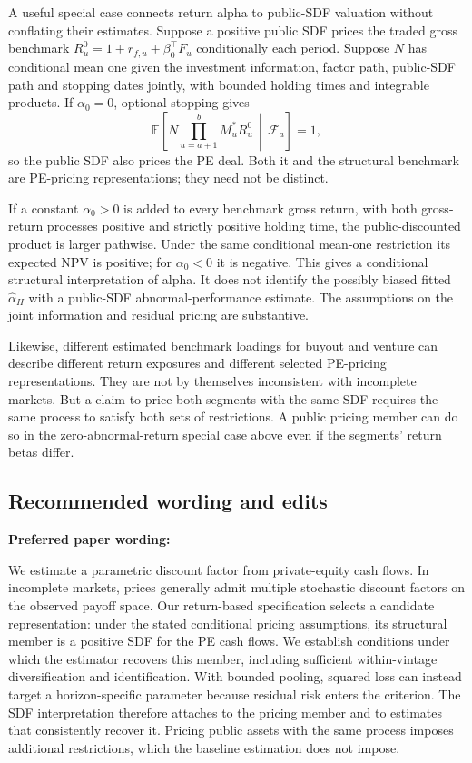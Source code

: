 \documentclass[11pt]{article}
\newcommand{\E}{\mathbb{E}}
\theoremstyle{plain}
\theoremstyle{definition}
\begin{document}
A useful special case connects return alpha to public-SDF valuation without conflating their estimates. Suppose a positive public SDF prices the traded gross benchmark $R^0_u=1+r_{f,u}+\beta_0^\top F_u$ conditionally each period. Suppose $N$ has conditional mean one given the investment information, factor path, public-SDF path and stopping dates jointly, with bounded holding times and integrable products. If $\alpha_0=0$, optional stopping gives
\[
\E\left[N\prod_{u=a+1}^b M_u^\ast R^0_u\,\middle|\,\mathcal F_a\right]=1,
\]
so the public SDF also prices the PE deal. Both it and the structural benchmark are PE-pricing representations; they need not be distinct.

If a constant $\alpha_0>0$ is added to every benchmark gross return, with both gross-return processes positive and strictly positive holding time, the public-discounted product is larger pathwise. Under the same conditional mean-one restriction its expected NPV is positive; for $\alpha_0<0$ it is negative. This gives a conditional structural interpretation of alpha. It does not identify the possibly biased fitted $\hat\alpha_H$ with a public-SDF abnormal-performance estimate. The assumptions on the joint information and residual pricing are substantive.

Likewise, different estimated benchmark loadings for buyout and venture can describe different return exposures and different selected PE-pricing representations. They are not by themselves inconsistent with incomplete markets. But a claim to price both segments with the same SDF requires the same process to satisfy both sets of restrictions. A public pricing member can do so in the zero-abnormal-return special case above even if the segments' return betas differ.

\subsection{Recommended wording and edits}
\label{app:sdf_todo}

\textbf{Preferred paper wording:}
\begin{draft}
We estimate a parametric discount factor from private-equity cash flows. In incomplete markets, prices generally admit multiple stochastic discount factors on the observed payoff space. Our return-based specification selects a candidate representation: under the stated conditional pricing assumptions, its structural member is a positive SDF for the PE cash flows. We establish conditions under which the estimator recovers this member, including sufficient within-vintage diversification and identification. With bounded pooling, squared loss can instead target a horizon-specific parameter because residual risk enters the criterion. The SDF interpretation therefore attaches to the pricing member and to estimates that consistently recover it. Pricing public assets with the same process imposes additional restrictions, which the baseline estimation does not impose.
\end{draft}
\end{document}
